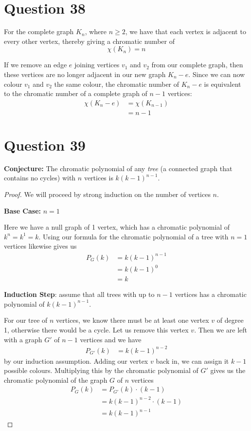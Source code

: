 \documentclass[11pt, oneside]{article}   	%
\begin{document}
\section*{Question 38}

For the complete graph $K_n$, where $n \geq 2$, we have that each vertex is adjacent to every other vertex, thereby giving a chromatic number of
	$$\chi(K_n) = n$$

If we remove an edge $e$ joining vertices $v_1$ and $v_2$ from our complete graph, then these vertices are no longer adjacent in our new graph $K_n - e$. Since we can now colour $v_1$ and $v_2$ the same colour, the chromatic number of $K_n - e$ is equivalent to the chromatic number of a complete graph of $n-1$ vertices:
	\begin{align*}
		\chi(K_n - e) & = \chi(K_{n-1}) \\
		& = n-1
	\end{align*}


\section*{Question 39}

\textbf{Conjecture:} The chromatic polynomial of any \textit{tree} (a connected graph that contains no cycles) with $n$ vertices is $k(k-1)^{n-1}$.

\begin{proof}
We will proceed by strong induction on the number of vertices $n$.

\textbf{Base Case:} $n=1$

Here we have a null graph of 1 vertex, which has a chromatic polynomial of $k^n = k^1 = k$. Using our formula for the chromatic polynomial of a tree with $n=1$ vertices likewise gives us
	\begin{align*}
		P_G(k) & = k(k-1)^{n-1} \\
		& = k(k-1)^0 \\
		& = k
	\end{align*}

\textbf{Induction Step}: assume that all trees with up to $n-1$ vertices has a chromatic polynomial of $k(k-1)^{n-1}$.

For our tree of $n$ vertices, we know there must be at least one vertex $v$ of degree 1, otherwise there would be a cycle. Let us remove this vertex $v$. Then we are left with a graph $G'$ of $n-1$ vertices and we have
	\begin{align*}
		P_{G'}(k) & = k(k-1)^{n-2}
	\end{align*}
by our induction assumption. Adding our vertex $v$ back in, we can assign it $k-1$ possible colours. Multiplying this by the chromatic polynomial of $G'$ gives us the chromatic polynomial of the graph $G$ of $n$ vertices
	\begin{align*}
		P_{G}(k) & = P_{G'}(k) \cdot (k-1) \\
		& = k(k-1)^{n-2} \cdot (k-1) \\
		& = k(k-1)^{n-1} 
	\end{align*}
\end{proof}
\end{document}
